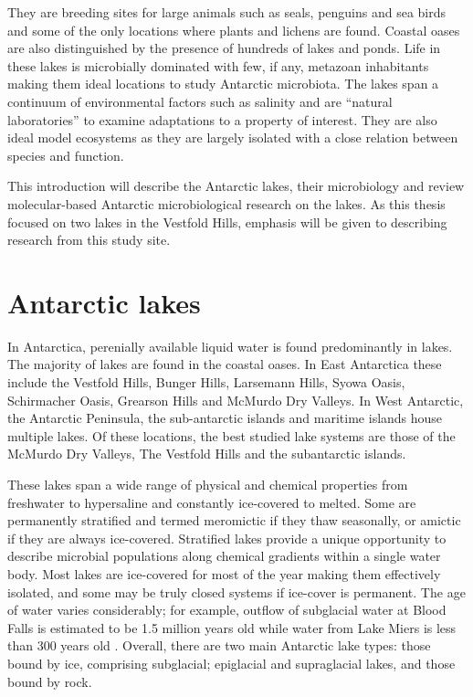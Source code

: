 They are breeding sites for large animals such as seals, penguins and sea birds and some of the only locations where plants and lichens are found.
Coastal oases are also distinguished by the presence of hundreds of lakes and ponds.
Life in these lakes is microbially dominated with few, if any, metazoan inhabitants \cite{Laybourn-Parry1997} making them ideal locations to study Antarctic microbiota. 
The lakes span a continuum of environmental factors such as salinity and are ``natural laboratories'' to examine adaptations to a property of interest. 
They are also ideal model ecosystems as they are largely isolated with a close relation between species and function.

This introduction will describe the Antarctic lakes, their microbiology and review molecular-based Antarctic microbiological research on the lakes.
As this thesis focused on two lakes in the Vestfold Hills, emphasis will be given to describing research from this study site.


\section{Antarctic lakes}
In Antarctica, perenially available liquid water is found predominantly in lakes. 
The majority of lakes are found in the coastal oases. %
In East Antarctica these include the Vestfold Hills, Bunger Hills, Larsemann Hills, Syowa Oasis, Schirmacher Oasis, Grearson Hills and McMurdo Dry Valleys.
In West Antarctic, the Antarctic Peninsula, the sub-antarctic islands and maritime islands house multiple lakes. 
Of these locations, the best studied lake systems are those of the McMurdo Dry Valleys, The Vestfold Hills and the subantarctic islands.

These lakes span a wide range of physical and chemical properties from freshwater to hypersaline and constantly ice-covered to melted.
Some are permanently stratified and termed meromictic if they thaw seasonally, or amictic if they are always ice-covered.
Stratified lakes provide a unique opportunity to describe microbial populations along chemical gradients within a single water body. 
Most lakes are ice-covered for most of the year making them effectively isolated, and some may be truly closed systems if ice-cover is permanent.
The age of water varies considerably; for example, outflow of subglacial water at Blood Falls is estimated to be 1.5 million years old \cite{Mikucki2009} while water from Lake Miers is less than 300 years old \cite{Green1988}. 
Overall, there are two main Antarctic lake types: those bound by ice, comprising subglacial; epiglacial and supraglacial lakes, and those bound by rock.


